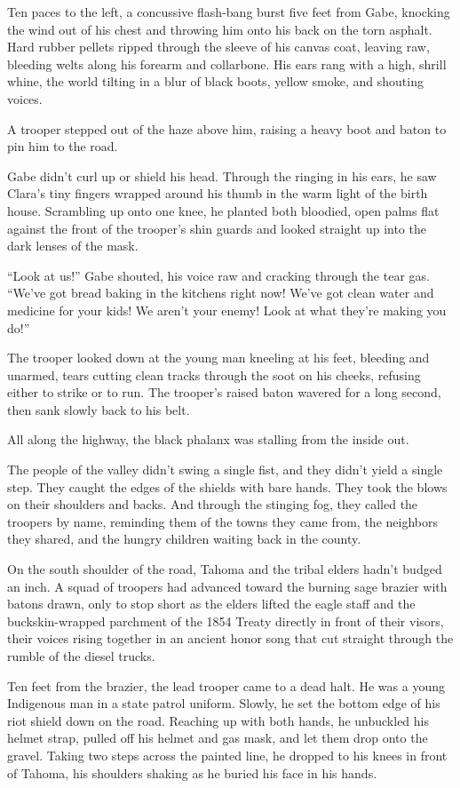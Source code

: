 Ten paces to the left, a concussive flash-bang burst five feet from Gabe, knocking the wind out of his chest and throwing him onto his back on the torn asphalt. Hard rubber pellets ripped through the sleeve of his canvas coat, leaving raw, bleeding welts along his forearm and collarbone. His ears rang with a high, shrill whine, the world tilting in a blur of black boots, yellow smoke, and shouting voices. 

A trooper stepped out of the haze above him, raising a heavy boot and baton to pin him to the road. 

Gabe didn't curl up or shield his head. Through the ringing in his ears, he saw Clara's tiny fingers wrapped around his thumb in the warm light of the birth house. Scrambling up onto one knee, he planted both bloodied, open palms flat against the front of the trooper's shin guards and looked straight up into the dark lenses of the mask.

``Look at us!'' Gabe shouted, his voice raw and cracking through the tear gas. ``We've got bread baking in the kitchens right now! We've got clean water and medicine for your kids! We aren't your enemy! Look at what they're making you do!''

The trooper looked down at the young man kneeling at his feet, bleeding and unarmed, tears cutting clean tracks through the soot on his cheeks, refusing either to strike or to run. The trooper’s raised baton wavered for a long second, then sank slowly back to his belt.

All along the highway, the black phalanx was stalling from the inside out. 

The people of the valley didn't swing a single fist, and they didn't yield a single step. They caught the edges of the shields with bare hands. They took the blows on their shoulders and backs. And through the stinging fog, they called the troopers by name, reminding them of the towns they came from, the neighbors they shared, and the hungry children waiting back in the county. 

On the south shoulder of the road, Tahoma and the tribal elders hadn't budged an inch. A squad of troopers had advanced toward the burning sage brazier with batons drawn, only to stop short as the elders lifted the eagle staff and the buckskin-wrapped parchment of the 1854 Treaty directly in front of their visors, their voices rising together in an ancient honor song that cut straight through the rumble of the diesel trucks. 

Ten feet from the brazier, the lead trooper came to a dead halt. He was a young Indigenous man in a state patrol uniform. Slowly, he set the bottom edge of his riot shield down on the road. Reaching up with both hands, he unbuckled his helmet strap, pulled off his helmet and gas mask, and let them drop onto the gravel. Taking two steps across the painted line, he dropped to his knees in front of Tahoma, his shoulders shaking as he buried his face in his hands.

